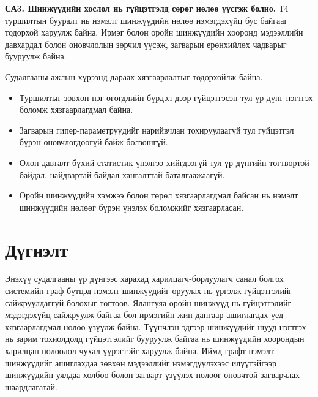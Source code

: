 \documentclass[conference]{IEEEtran}
\begin{document}
\textbf{СА3. Шинжүүдийн хослол нь гүйцэтгэлд сөрөг нөлөө үүсгэж болно.}  
Т4 туршилтын бууралт нь нэмэлт шинжүүдийн нөлөө нэмэгдэхүйц бус байгааг тодорхой харуулж байна. Ирмэг болон оройн шинжүүдийн хооронд мэдээллийн давхардал болон оновчлолын зөрчил үүсэж, загварын ерөнхийлөх чадварыг бууруулж байна.

Судалгааны ажлын хүрээнд дараах хязгаарлалтыг тодорхойлж байна.
\begin{itemize}
\item Туршилтыг зөвхөн нэг өгөгдлийн бүрдэл дээр гүйцэтгэсэн тул үр дүнг нэгтгэх боломж хязгаарлагдмал байна.
\item Загварын гипер-параметрүүдийг нарийвчлан тохируулаагүй тул гүйцэтгэл бүрэн оновчлогдоогүй байж болзошгүй.
\item Олон давталт бүхий статистик үнэлгээ хийгдээгүй тул үр дүнгийн тогтвортой байдал, найдвартай байдал хангалттай баталгаажаагүй.
\item Оройн шинжүүдийн хэмжээ болон төрөл хязгаарлагдмал байсан нь нэмэлт шинжүүдийн нөлөөг бүрэн үнэлэх боломжийг хязгаарласан.
\end{itemize}

\section{Дүгнэлт}

Энэхүү судалгааны үр дүнгээс харахад харилцагч-борлуулагч санал болгох системийн граф бүтцэд нэмэлт шинжүүдийг оруулах нь үргэлж гүйцэтгэлийг сайжруулдаггүй болохыг тогтоов. Ялангуяа оройн шинжүүд нь гүйцэтгэлийг мэдэгдэхүйц сайжруулж байгаа бол ирмэгийн жин дангаар ашиглагдах үед хязгаарлагдмал нөлөө үзүүлж байна. Түүнчлэн эдгээр шинжүүдийг шууд нэгтгэх нь зарим тохиолдолд гүйцэтгэлийг бууруулж байгаа нь шинжүүдийн хоорондын харилцан нөлөөлөл чухал үүрэгтэйг харуулж байна. Иймд графт нэмэлт шинжүүдийг ашиглахдаа зөвхөн мэдээллийг нэмэгдүүлэхээс илүүтэйгээр шинжүүдийн уялдаа холбоо болон загварт үзүүлэх нөлөөг оновчтой загварчлах шаардлагатай.
\end{document}
